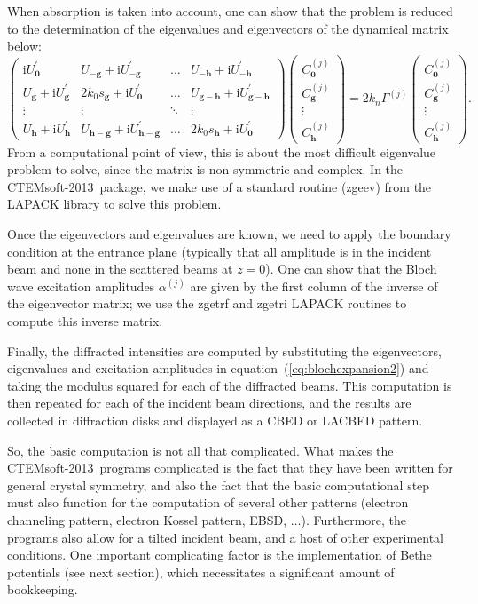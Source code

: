 \documentclass[DIV=calc, paper=letter, fontsize=11pt]{scrartcl}	 %
\newcommand{\ctp}{\textsf{CTEMsoft-2013}}
\newcommand{\upg}[1]{\mathrm{i}U_{\mathbf{#1}}^{\prime}}
\newcommand{\combo}[1]{U_{\mathbf{#1}}+\upg{#1}}
\newcommand{\upgcombo}[2]{2k_{0}s_{\mathbf{#1}}+\upg{#2}}
\newcommand{\Cgj}[2]{C_{\mathbf{#1}}^{(#2)}}
\begin{document}
When absorption is taken into account, one can show that the problem is reduced
to the determination of the eigenvalues and eigenvectors of the dynamical matrix below:
\begin{equation}
	\left(\begin{matrix}
	\upg{0} & \combo{-g} & \ldots & \combo{-h}\\
	\combo{g} & \upgcombo{g}{0} & \ldots & \combo{g-h}\\
	\vdots  &  \vdots &  \ddots  &  \vdots\\
	\combo{h} & \combo{h-g} & \ldots & \upgcombo{h}{0}
	\end{matrix}\right)
	\left(\begin{matrix}
	\Cgj{0}{j}\\ \Cgj{g}{j}\\ \vdots\\ \Cgj{h}{j}
	\end{matrix}\right)=2k_{n}\Gamma^{(j)}\left(\begin{matrix}
	\Cgj{0}{j}\\ \Cgj{g}{j}\\ \vdots\\ \Cgj{h}{j}
	\end{matrix}\right).\label{eq:blochmatrixabs}
\end{equation}
From a computational point of view, this is about the most difficult eigenvalue problem to solve, since 
the matrix is non-symmetric and complex.  In the \ctp\ package, we make use of a standard routine (\textsf{zgeev}) from the LAPACK
library to solve this problem.

Once the eigenvectors and eigenvalues are known, we need to apply the boundary condition at the 
entrance plane (typically that all amplitude is in the incident beam and none in the scattered beams at $z=0$).
One can show that the Bloch wave excitation amplitudes $\alpha^{(j)}$ are given by the first column of the 
inverse of the eigenvector matrix; we use the \textsf{zgetrf} and \textsf{zgetri} LAPACK routines to compute 
this inverse matrix.

Finally, the diffracted intensities are computed by substituting the eigenvectors, eigenvalues and excitation
amplitudes in equation~(\ref{eq:blochexpansion2}) and taking the modulus squared for each of the diffracted beams.
This computation is then repeated for each of the incident beam directions, and the results are collected in 
diffraction disks and displayed as a CBED or LACBED pattern.

So, the basic computation is not all that complicated.  What makes the \ctp\ programs complicated is the fact 
that they have been written for general crystal symmetry, and also the fact that the basic computational step
must also function for the computation of several other patterns (electron channeling pattern, electron Kossel pattern, EBSD, $\ldots$).
Furthermore, the programs also allow for a tilted incident beam, and a host of other experimental conditions.
One important complicating factor is the implementation of Bethe potentials (see next section), which  
necessitates a significant amount of bookkeeping.
\end{document}
